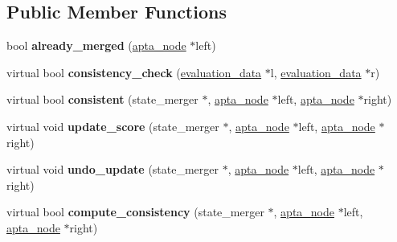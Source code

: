 \subsection*{Public Member Functions}
\begin{DoxyCompactItemize}
\item 
bool {\bfseries already\+\_\+merged} (\hyperlink{classapta__node}{apta\+\_\+node} $\ast$left)\hypertarget{classevaluation__function_a66ed8b822b6cf90b37716edf50314886}{}\label{classevaluation__function_a66ed8b822b6cf90b37716edf50314886}

\item 
virtual bool {\bfseries consistency\+\_\+check} (\hyperlink{classevaluation__data}{evaluation\+\_\+data} $\ast$l, \hyperlink{classevaluation__data}{evaluation\+\_\+data} $\ast$r)\hypertarget{classevaluation__function_ac6a91c189027249847e00eab2b8bf52f}{}\label{classevaluation__function_ac6a91c189027249847e00eab2b8bf52f}

\item 
virtual bool {\bfseries consistent} (state\+\_\+merger $\ast$, \hyperlink{classapta__node}{apta\+\_\+node} $\ast$left, \hyperlink{classapta__node}{apta\+\_\+node} $\ast$right)\hypertarget{classevaluation__function_ac226c4fd2b73272b4ef7fa94f9a45744}{}\label{classevaluation__function_ac226c4fd2b73272b4ef7fa94f9a45744}

\item 
virtual void {\bfseries update\+\_\+score} (state\+\_\+merger $\ast$, \hyperlink{classapta__node}{apta\+\_\+node} $\ast$left, \hyperlink{classapta__node}{apta\+\_\+node} $\ast$right)\hypertarget{classevaluation__function_afabbf2a4ce4af020707fba03d171f75e}{}\label{classevaluation__function_afabbf2a4ce4af020707fba03d171f75e}

\item 
virtual void {\bfseries undo\+\_\+update} (state\+\_\+merger $\ast$, \hyperlink{classapta__node}{apta\+\_\+node} $\ast$left, \hyperlink{classapta__node}{apta\+\_\+node} $\ast$right)\hypertarget{classevaluation__function_ad0668d572e56e12c0ed267000391432a}{}\label{classevaluation__function_ad0668d572e56e12c0ed267000391432a}

\item 
virtual bool {\bfseries compute\+\_\+consistency} (state\+\_\+merger $\ast$, \hyperlink{classapta__node}{apta\+\_\+node} $\ast$left, \hyperlink{classapta__node}{apta\+\_\+node} $\ast$right)\hypertarget{classevaluation__function_a423a489d49a8156f60e2fce98d0fe525}{}\label{classevaluation__function_a423a489d49a8156f60e2fce98d0fe525}


\end{DoxyCompactItemize}

